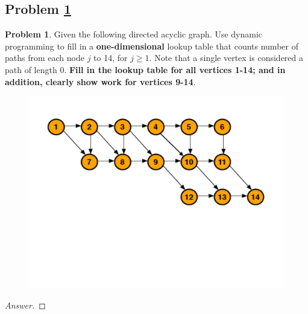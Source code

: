 \documentclass[11pt]{article}
\theoremstyle{definition}
\theoremstyle{definition}
\newtheorem{required}{Problem}
\theoremstyle{definition}
\begin{document}
\subsection{Problem \ref{Recurrence1}}
\begin{required} \label{Recurrence1}
Given the following directed acyclic graph. Use dynamic programming to fill in a \textbf{one-dimensional} lookup table that counts number of paths from each node $j$ to 14, for $j \geq 1$. Note that a single vertex is considered a path of length $0$. \textbf{Fill in the lookup table for all vertices 1-14; and in addition, clearly show work for vertices 9-14}.

        \begin{figure}[h!]
        \begin{center}
        \includegraphics[scale=0.45]{dag_ps10.pdf} 
        \end{center}
        \end{figure}

\end{required}


\begin{proof}[Answer]
\end{proof}




\newpage
\end{document}

